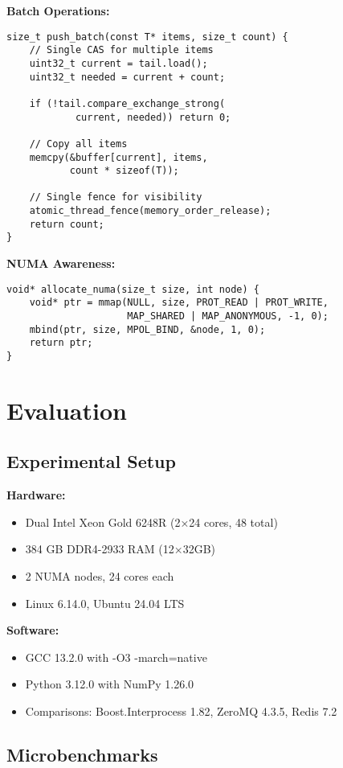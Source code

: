 \documentclass[letterpaper,twocolumn,10pt]{article}
\begin{document}
\textbf{Batch Operations:}
\begin{lstlisting}
size_t push_batch(const T* items, size_t count) {
    // Single CAS for multiple items
    uint32_t current = tail.load();
    uint32_t needed = current + count;
    
    if (!tail.compare_exchange_strong(
            current, needed)) return 0;
    
    // Copy all items
    memcpy(&buffer[current], items, 
           count * sizeof(T));
    
    // Single fence for visibility
    atomic_thread_fence(memory_order_release);
    return count;
}
\end{lstlisting}

\textbf{NUMA Awareness:}
\begin{lstlisting}
void* allocate_numa(size_t size, int node) {
    void* ptr = mmap(NULL, size, PROT_READ | PROT_WRITE,
                     MAP_SHARED | MAP_ANONYMOUS, -1, 0);
    mbind(ptr, size, MPOL_BIND, &node, 1, 0);
    return ptr;
}
\end{lstlisting}

\section{Evaluation}

\subsection{Experimental Setup}

\textbf{Hardware:}
\begin{itemize}
\item Dual Intel Xeon Gold 6248R (2×24 cores, 48 total)
\item 384 GB DDR4-2933 RAM (12×32GB)
\item 2 NUMA nodes, 24 cores each
\item Linux 6.14.0, Ubuntu 24.04 LTS
\end{itemize}

\textbf{Software:}
\begin{itemize}
\item GCC 13.2.0 with -O3 -march=native
\item Python 3.12.0 with NumPy 1.26.0
\item Comparisons: Boost.Interprocess 1.82, ZeroMQ 4.3.5, Redis 7.2
\end{itemize}

\subsection{Microbenchmarks}
\end{document}
